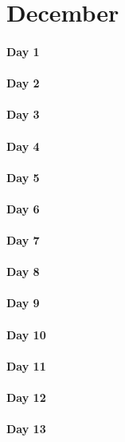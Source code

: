 \documentclass[UTF8,a4paper,8pt]{ctexart}
\begin{document}
\section{December}
 	 \paragraph{Day 1       \quad     }
 	 \paragraph{Day 2       \quad     }
 	 \paragraph{Day 3       \quad     }
 	 \paragraph{Day 4       \quad     }
 	 \paragraph{Day 5       \quad     }
 	 \paragraph{Day 6       \quad     }
 	 \paragraph{Day 7       \quad     }
 	 \paragraph{Day 8       \quad     }
 	 \paragraph{Day 9       \quad     }
 	 \paragraph{Day 10      \quad     }
 	 \paragraph{Day 11      \quad     }
 	 \paragraph{Day 12      \quad     }
 	 \paragraph{Day 13      \quad     }
\end{document}

